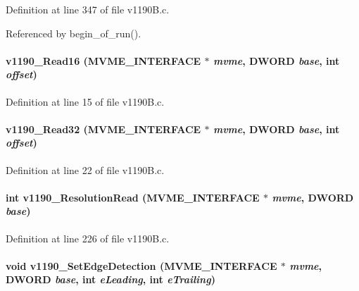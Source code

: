 Definition at line 347 of file v1190B.c.

Referenced by begin\_\-of\_\-run().
\paragraph[{v1190\_\-Read16}]{ v1190\_\-Read16 ({\bf MVME\_\-INTERFACE} $\ast$ {\em mvme}, \/  {\bf DWORD} {\em base}, \/  int {\em offset})}\hfill\label{v1190B_8h_a9e84eeda088ad0164da8f86fa37801fb}


Definition at line 15 of file v1190B.c.
\paragraph[{v1190\_\-Read32}]{ v1190\_\-Read32 ({\bf MVME\_\-INTERFACE} $\ast$ {\em mvme}, \/  {\bf DWORD} {\em base}, \/  int {\em offset})}\hfill\label{v1190B_8h_a726bf5ad9a4996c0b8980db2ae2452c2}


Definition at line 22 of file v1190B.c.
\paragraph[{v1190\_\-ResolutionRead}]{\setlength{\rightskip}{0pt plus 5cm}int v1190\_\-ResolutionRead ({\bf MVME\_\-INTERFACE} $\ast$ {\em mvme}, \/  {\bf DWORD} {\em base})}\hfill\label{v1190B_8h_ac0e1f3f3142c14efc3aaefe2136b87a0}


Definition at line 226 of file v1190B.c.
\paragraph[{v1190\_\-SetEdgeDetection}]{\setlength{\rightskip}{0pt plus 5cm}void v1190\_\-SetEdgeDetection ({\bf MVME\_\-INTERFACE} $\ast$ {\em mvme}, \/  {\bf DWORD} {\em base}, \/  int {\em eLeading}, \/  int {\em eTrailing})}\hfill\label{v1190B_8h_a8f23d6c3a88ff52c4b6a87c9fcea2ad5}


